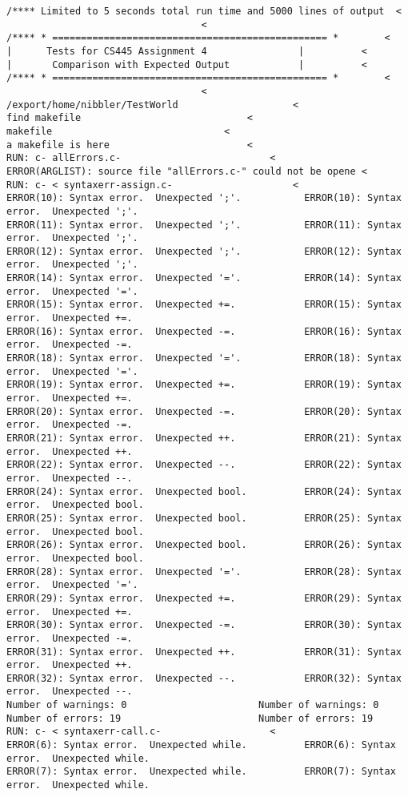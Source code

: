 \documentclass[12pt]{book}
\begin{document}
\lstset{language=java,label= ,caption= ,numbers=none}
\begin{lstlisting}
/**** Limited to 5 seconds total run time and 5000 lines of output  <
							      <
/**** * ================================================ *	      <
|      Tests for CS445 Assignment 4                |	      <
|       Comparison with Expected Output            |	      <
/**** * ================================================ *	      <
							      <
/export/home/nibbler/TestWorld				      <
find makefile						      <
makefile						      <
a makefile is here					      <
RUN: c- allErrors.c-					      <
ERROR(ARGLIST): source file "allErrors.c-" could not be opene <
RUN: c- < syntaxerr-assign.c-				      <
ERROR(10): Syntax error.  Unexpected ';'.			ERROR(10): Syntax error.  Unexpected ';'.
ERROR(11): Syntax error.  Unexpected ';'.			ERROR(11): Syntax error.  Unexpected ';'.
ERROR(12): Syntax error.  Unexpected ';'.			ERROR(12): Syntax error.  Unexpected ';'.
ERROR(14): Syntax error.  Unexpected '='.			ERROR(14): Syntax error.  Unexpected '='.
ERROR(15): Syntax error.  Unexpected +=.			ERROR(15): Syntax error.  Unexpected +=.
ERROR(16): Syntax error.  Unexpected -=.			ERROR(16): Syntax error.  Unexpected -=.
ERROR(18): Syntax error.  Unexpected '='.			ERROR(18): Syntax error.  Unexpected '='.
ERROR(19): Syntax error.  Unexpected +=.			ERROR(19): Syntax error.  Unexpected +=.
ERROR(20): Syntax error.  Unexpected -=.			ERROR(20): Syntax error.  Unexpected -=.
ERROR(21): Syntax error.  Unexpected ++.			ERROR(21): Syntax error.  Unexpected ++.
ERROR(22): Syntax error.  Unexpected --.			ERROR(22): Syntax error.  Unexpected --.
ERROR(24): Syntax error.  Unexpected bool.			ERROR(24): Syntax error.  Unexpected bool.
ERROR(25): Syntax error.  Unexpected bool.			ERROR(25): Syntax error.  Unexpected bool.
ERROR(26): Syntax error.  Unexpected bool.			ERROR(26): Syntax error.  Unexpected bool.
ERROR(28): Syntax error.  Unexpected '='.			ERROR(28): Syntax error.  Unexpected '='.
ERROR(29): Syntax error.  Unexpected +=.			ERROR(29): Syntax error.  Unexpected +=.
ERROR(30): Syntax error.  Unexpected -=.			ERROR(30): Syntax error.  Unexpected -=.
ERROR(31): Syntax error.  Unexpected ++.			ERROR(31): Syntax error.  Unexpected ++.
ERROR(32): Syntax error.  Unexpected --.			ERROR(32): Syntax error.  Unexpected --.
Number of warnings: 0						Number of warnings: 0
Number of errors: 19						Number of errors: 19
RUN: c- < syntaxerr-call.c-				      <
ERROR(6): Syntax error.  Unexpected while.			ERROR(6): Syntax error.  Unexpected while.
ERROR(7): Syntax error.  Unexpected while.			ERROR(7): Syntax error.  Unexpected while.

\end{lstlisting}
\end{document}

